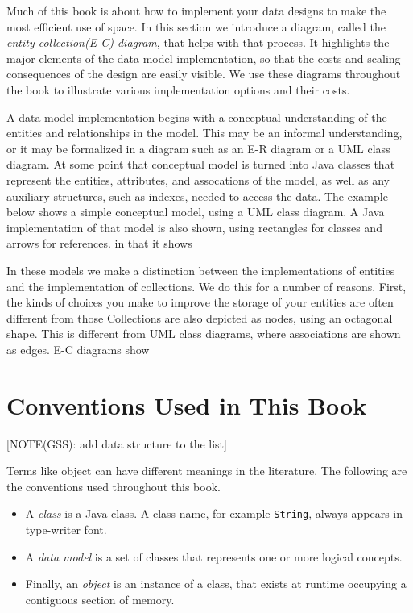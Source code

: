 Much of this book is about how to implement your data designs to make the most
efficient use of space. In this section we introduce a diagram, called the
\emph{entity-collection(E-C) diagram}, that helps with that process. It
highlights the major elements of the data model implementation, so that the
costs and scaling consequences of the design are easily visible. We use these
diagrams throughout the book to illustrate various implementation options and
their costs.

A data model implementation begins with a conceptual understanding of the
entities and relationships in the model.  This may be an informal understanding,
or it may be formalized in a diagram such as an E-R diagram or a UML class
diagram.  At some point that conceptual model is turned into Java classes that
represent the entities, attributes, and assocations of the model, as well as any
auxiliary structures, such as indexes, needed to access the data.  The example
below shows a simple conceptual model, using a UML class diagram.  A Java
implementation of that model is also shown, using rectangles for classes and
arrows for references.  %
in that it shows


In these models we make a distinction between the implementations of entities
and the implementation of collections.  We do this for a number of reasons. 
First, the kinds of choices you make to improve the storage of your entities are
often different from those Collections are also depicted as nodes, using an
octagonal shape.  This is different from UML class diagrams, where associations
are shown as edges. E-C diagrams show


\section{Conventions Used in This Book}

[NOTE(GSS): add data structure to the list]

Terms like object can have different meanings in the literature.  The following are the conventions used throughout this book.

\begin{itemize}
\item A \textit{class} is a Java class. A class name, for example \texttt{String}, always appears in type-writer font. 
\item A \textit{data model} is a set of classes that represents one or more logical concepts.
\item Finally, an \textit{object} is an instance of a class, that exists at runtime occupying a contiguous section of memory.
\end{itemize} 







 

